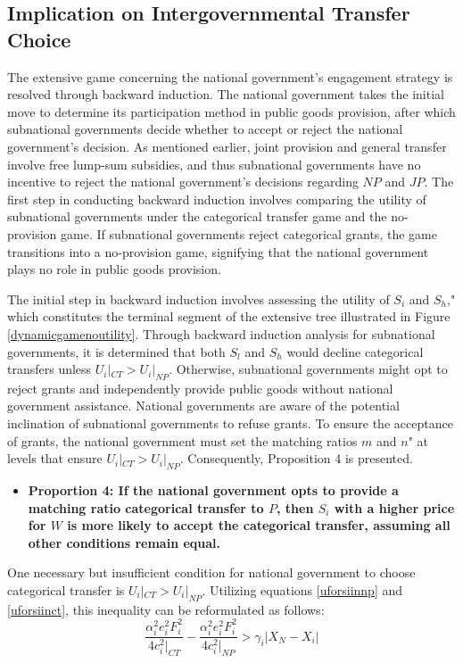 \documentclass[man]{apa7}
\begin{document}
\subsection{Implication on Intergovernmental Transfer Choice}

The extensive game concerning the national government's engagement strategy is resolved through backward induction. The national government takes the initial move to determine its participation method in public goods provision, after which subnational governments decide whether to accept or reject the national government's decision. As mentioned earlier, joint provision and general transfer involve free lump-sum subsidies, and thus subnational governments have no incentive to reject the national government's decisions regarding $NP$ and $JP$. The first step in conducting backward induction involves comparing the utility of subnational governments under the categorical transfer game and the no-provision game. If subnational governments reject categorical grants, the game transitions into a no-provision game, signifying that the national government plays no role in public goods provision.

The initial step in backward induction involves assessing the utility of $S_i$ and $S_h$," which constitutes the terminal segment of the extensive tree illustrated in Figure \ref{dynamicgamenoutility}. Through backward induction analysis for subnational governments, it is determined that both $S_l$ and $S_h$ would decline categorical transfers unless $U_i|_{CT}>U_i|_{NP}$. Otherwise, subnational governments might opt to reject grants and independently provide public goods without national government assistance. National governments are aware of the potential inclination of subnational governments to refuse grants. To ensure the acceptance of grants, the national government must set the matching ratios $m$ and $n$" at levels that ensure $U_i|_{CT} > U_i|_{NP}$. Consequently, Proposition 4 is presented.%

\begin {itemize}
\item \textbf{Proportion 4: If the national government opts to provide a matching ratio categorical transfer to $P$, then $S_i$ with a higher price for $W$ is more likely to accept the categorical transfer, assuming all other conditions remain equal.}
\end{itemize}

One necessary but insufficient condition for national government to choose categorical transfer is $U_i|_{CT} > U_i|_{NP}$. Utilizing equations \ref{uforsiinnp} and \ref{uforsiinct}, this inequality can be reformulated as follows:
\begin{equation}
  \frac{\alpha_i^2 e_i^2 F_i^2}{4c_i^2|_{CT}}-\frac{\alpha_i^2 e_i^2 F_i^2}{4c_i^2|_{NP}} > \gamma_i|X_N-X_i| \label{ctunpu}
\end{equation}
\end{document}
